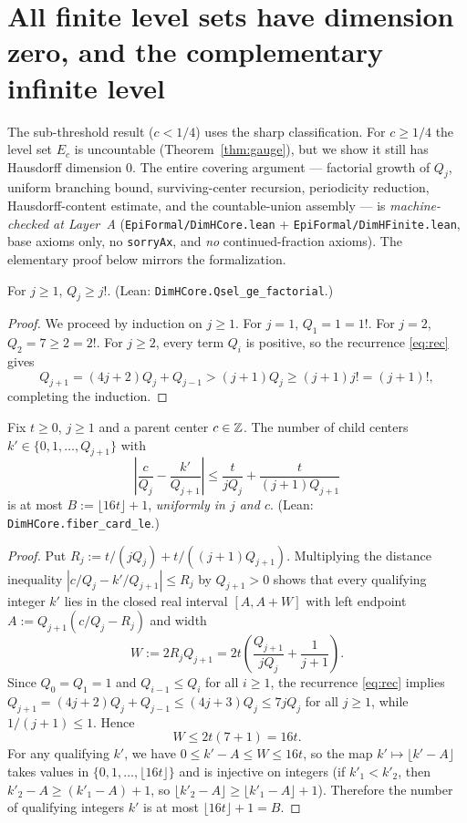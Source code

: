 \section{All finite level sets have dimension zero, and the complementary infinite level}\label{sec:finite-levels}

The sub-threshold result ($c<1/4$) uses the sharp classification. For
$c\ge1/4$ the level set $E_c$ is uncountable (Theorem~\ref{thm:gauge}), but we
show it still has Hausdorff dimension $0$. The entire covering argument ---
factorial growth of $Q_j$, uniform branching bound, surviving-center recursion,
periodicity reduction, Hausdorff-content estimate, and the countable-union
assembly --- is \emph{machine-checked at Layer~A}
(\texttt{EpiFormal/DimHCore.lean} + \texttt{EpiFormal/DimHFinite.lean}, base
axioms only, no \texttt{sorryAx}, and \emph{no} continued-fraction axioms).
The elementary proof below mirrors the formalization.

\begin{lemma}\label{lem:factorial}
For $j\ge1$, $Q_j\ge j!$. (Lean: \texttt{DimHCore.\allowbreak Qsel\_ge\_factorial}.)
\end{lemma}

\begin{proof}
We proceed by induction on $j\ge1$. For $j=1$, $Q_1=1=1!$. For $j=2$,
$Q_2=7\ge2=2!$. For $j\ge2$, every term $Q_i$ is positive, so the recurrence
\eqref{eq:rec} gives
\[
Q_{j+1}=(4j+2)Q_j+Q_{j-1}>(j+1)Q_j\ge(j+1)j!=(j+1)!,
\]
completing the induction.
\end{proof}

\begin{lemma}\label{lem:branch}
Fix $t\ge0$, $j\ge1$ and a parent center $c\in\mathbb{Z}$. The number of child centers
$k'\in\{0,1,\dots,Q_{j+1}\}$ with
\[
\left|\frac{c}{Q_j}-\frac{k'}{Q_{j+1}}\right|\le \frac{t}{jQ_j}+\frac{t}{(j+1)Q_{j+1}}
\]
is at most $B:=\lfloor16t\rfloor+1$, \emph{uniformly in $j$ and $c$}.
(Lean: \texttt{DimHCore.\allowbreak fiber\_card\_le}.)
\end{lemma}

\begin{proof}
Put $R_j:=t/(jQ_j)+t/((j+1)Q_{j+1})$. Multiplying the distance inequality
$|c/Q_j-k'/Q_{j+1}|\le R_j$ by $Q_{j+1}>0$ shows that every qualifying integer
$k'$ lies in the closed real interval $[A,A+W]$ with left endpoint
$A:=Q_{j+1}(c/Q_j-R_j)$ and width
\[
W:=2R_jQ_{j+1}=2t\left(\frac{Q_{j+1}}{jQ_j}+\frac{1}{j+1}\right).
\]
Since $Q_0=Q_1=1$ and $Q_{i-1}\le Q_i$ for all $i\ge1$, the recurrence
\eqref{eq:rec} implies $Q_{j+1}=(4j+2)Q_j+Q_{j-1}\le(4j+3)Q_j\le7jQ_j$ for all
$j\ge1$, while $1/(j+1)\le1$. Hence
\[
W\le 2t(7+1)=16t.
\]
For any qualifying $k'$, we have $0\le k'-A\le W\le16t$, so the map
$k'\mapsto\lfloor k'-A\rfloor$ takes values in $\{0,1,\dots,\lfloor16t\rfloor\}$
and is injective on integers (if $k'_1<k'_2$, then $k'_2-A\ge(k'_1-A)+1$, so
$\lfloor k'_2-A\rfloor\ge\lfloor k'_1-A\rfloor+1$). Therefore the number of
qualifying integers $k'$ is at most $\lfloor16t\rfloor+1=B$.
\end{proof}

